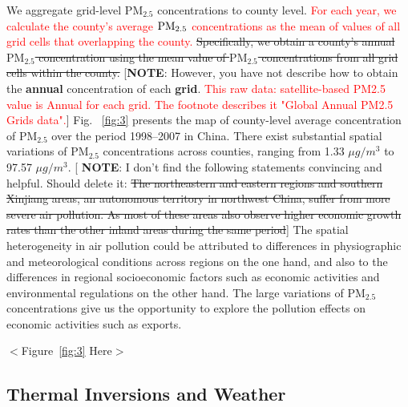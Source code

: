 \documentclass[12pt]{article}
\begin{document}
    We aggregate grid-level $\mathrm{PM_{2.5}}$ concentrations to county level. \textcolor{red}{For each year, we calculate the county's average $\rm PM_{2.5}$ concentrations as the mean of values of all grid cells that overlapping
    the county.}
    \sout{Specifically, we obtain a county's annual $\mathrm{PM_{2.5}}$ concentration
    using the mean value of $\mathrm{PM_{2.5}}$ concentrations from all grid
    cells within the county.} [\textbf{NOTE}: However, you have not describe how
    to obtain the \textbf{annual} concentration of each \textbf{grid}. \textcolor{red} {This raw data: satellite-based PM2.5 value is Annual for each grid. The footnote describes it "Global Annual PM2.5 Grids data".}] Fig.~%
    \ref{fig:3} presents the map of county-level average concentration of $%
    \mathrm{PM_{2.5}}$ over the period 1998--2007 in China. There exist
    substantial spatial variations of $\mathrm{PM_{2.5}}$ concentrations across
    counties, ranging from 1.33 $\mu g/m^{3}$ to 97.57 $\mu g/m^{3}$. [\textbf{%
    NOTE}: I don't find the following statements convincing and helpful. Should
    delete it: \sout{The northeastern and eastern regions and southern Xinjiang
    areas, an autonomous territory in northwest China, suffer from more severe
    air pollution. As most of these areas also observe higher economic growth
    rates than the other inland areas during the same period}] The spatial heterogeneity in air pollution could be
    attributed to differences in physiographic and meteorological conditions
    across regions on the one hand, and also to the differences in regional
    socioeconomic factors such as economic activities and environmental
    regulations on the other hand. The large variations of $\mathrm{PM_{2.5}}$
    concentrations give us the opportunity to explore the pollution effects on
    economic activities such as exports. 
    
    \begin{center}
    $<$Figure~\ref{fig:3} Here$>$
    \end{center}

    \subsection{Thermal Inversions and Weather}
\end{document}
